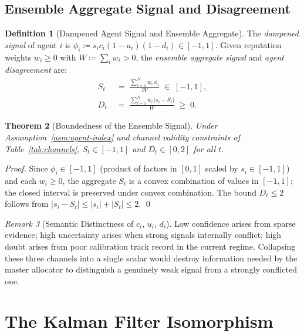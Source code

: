 \documentclass[12pt,openany]{book}
\numberwithin{equation}{chapter}
\theoremstyle{plain}
\newtheorem{theorem}{Theorem}[chapter]
\theoremstyle{definition}
\newtheorem{definition}[theorem]{Definition}
\theoremstyle{remark}
\newtheorem{remark}[theorem]{Remark}
\begin{document}
\section{Ensemble Aggregate Signal and Disagreement}

\begin{definition}[Dampened Agent Signal and Ensemble Aggregate]
\label{def:ensemble}
The \emph{dampened signal} of agent $i$ is
$\phi_i \coloneqq s_i c_i (1-u_i)(1-d_i) \in [-1,1]$.
Given reputation weights $w_i \geq 0$ with
$W \coloneqq \sum_i w_i > 0$, the \emph{ensemble aggregate
signal} and \emph{agent disagreement} are:
\begin{align}
  S_t &\;=\; \frac{\sum_{i=1}^{N} w_i\,\phi_i}{W}
  \;\in\; [-1,1],
  \label{eq:ensemble-signal} \\[4pt]
  D_t &\;=\; \frac{\sum_{i=1}^{N} w_i\,|s_i - S_t|}{W}
  \;\geq\; 0.
  \label{eq:disagreement}
\end{align}
\end{definition}

\begin{theorem}[Boundedness of the Ensemble Signal]
\label{thm:signal-bounded}
Under Assumption~\ref{asm:agent-index} and channel validity
constraints of Table~\ref{tab:channels},
$S_t \in [-1,1]$ and $D_t \in [0,2]$ for all $t$.
\end{theorem}

\begin{proof}
Since $\phi_i \in [-1,1]$ (product of factors in $[0,1]$ scaled
by $s_i \in [-1,1]$) and each $w_i \geq 0$, the aggregate $S_t$
is a convex combination of values in $[-1,1]$; the closed interval
is preserved under convex combination.  The bound $D_t \leq 2$
follows from $|s_i - S_t| \leq |s_i| + |S_t| \leq 2$.
\qed
\end{proof}

\begin{remark}[Semantic Distinctness of $c_i$, $u_i$, $d_i$]
\label{rem:channels}
Low confidence arises from sparse evidence; high uncertainty
arises when strong signals internally conflict; high doubt
arises from poor calibration track record in the current regime.
Collapsing these three channels into a single scalar would
destroy information needed by the master allocator to distinguish
a genuinely weak signal from a strongly conflicted one.
\end{remark}

\chapter{The Kalman Filter Isomorphism}
\label{ch:kalman}
\end{document}
